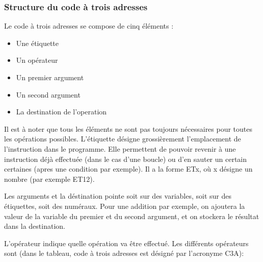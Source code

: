\documentclass{article}
\begin{document}
\subsubsection{Structure du code à trois adresses}

Le code à trois adresses se compose de cinq éléments :
\begin{itemize}
\item Une étiquette
\item Un opérateur
\item Un premier argument
\item Un second argument
\item La destination de l'operation
\end{itemize}

Il est à noter que tous les éléments ne sont pas toujours nécessaires pour toutes les opérations possibles.
\medbreak
L'étiquette désigne grossièrement l'emplacement de l'instruction dans le programme. Elle permettent de pouvoir revenir à une instruction déjà effectuée (dans le cas d'une boucle) ou d'en sauter un certain certaines (apres une condition par exemple). Il a la forme ETx, où x désigne un nombre (par exemple ET12).

Les arguments et la déstination pointe soit sur des variables, soit sur des étiquettes, soit des numéraux. Pour une addition par exemple, on ajoutera la valeur de la variable du premier et du second argument, et on stockera le résultat dans la destination.

L'opérateur indique quelle opération va être effectué. Les différents opérateurs sont (dans le tableau, code à trois adresses est désigné par l'acronyme C3A):
\end{document}
